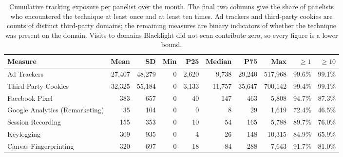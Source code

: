 \begin{table}[htbp]
\centering
\caption{Cumulative tracking exposure per panelist over the month. The final two columns give the share of panelists who encountered the technique at least once and at least ten times. Ad trackers and third-party cookies are counts of distinct third-party domains; the remaining measures are binary indicators of whether the technique was present on the domain. Visits to domains Blacklight did not scan contribute zero, so every figure is a lower bound.}
\label{tab:cumulative-exposure}
\begin{adjustbox}{max width=\textwidth}
\begin{tabular}{lrrrrrrrrr}
\toprule
Measure & Mean & SD & Min & P25 & Median & P75 & Max & $\geq 1$ & $\geq 10$ \\
\midrule
Ad Trackers & 27,407 & 48,279 & 0 & 2,620 & 9,738 & 29,240 & 517,968 & 99.6\% & 99.1\% \\
Third-Party Cookies & 32,325 & 55,184 & 0 & 3,133 & 11,757 & 35,647 & 700,142 & 99.4\% & 99.1\% \\
Facebook Pixel & 383 & 657 & 0 & 40 & 147 & 463 & 5,808 & 94.7\% & 87.3\% \\
Google Analytics (Remarketing) & 35 & 104 & 0 & 0 & 8 & 29 & 1,619 & 72.4\% & 46.5\% \\
Session Recording & 155 & 353 & 0 & 10 & 54 & 165 & 5,788 & 89.7\% & 76.0\% \\
Keylogging & 309 & 935 & 0 & 4 & 26 & 148 & 10,315 & 84.9\% & 65.9\% \\
Canvas Fingerprinting & 320 & 697 & 0 & 18 & 84 & 288 & 7,643 & 91.7\% & 81.0\% \\
\bottomrule
\end{tabular}
\end{adjustbox}
\end{table}
